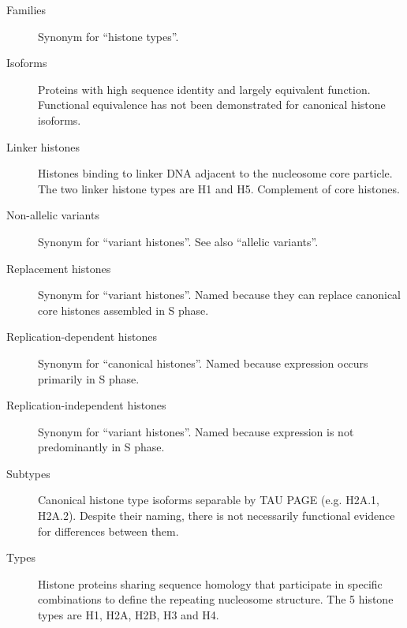 {\begin{shaded}
\begin{description}
        \item[Families] \hfill \newline
        Synonym for ``histone types''.

        \item[Isoforms] \hfill \newline
        Proteins with high sequence identity and largely equivalent function.
        Functional equivalence has not been demonstrated for canonical histone isoforms.

        \item[Linker histones] \hfill \newline
        Histones binding to linker DNA adjacent to the nucleosome core particle.
        The two linker histone types are H1 and H5. Complement of core histones.

        \item[Non-allelic variants] \hfill \newline
        Synonym for ``variant histones''. See also ``allelic variants''.

        \item[Replacement histones] \hfill \newline
        Synonym for ``variant histones''.
        Named because they can replace canonical core histones assembled in S phase.

        \item[Replication-dependent histones] \hfill \newline
        Synonym for ``canonical histones''.
        Named because expression occurs primarily in S phase.

        \item[Replication-independent histones] \hfill \newline
        Synonym for ``variant histones''.
        Named because expression is not predominantly in S phase.

        \item[Subtypes] \hfill \newline
        Canonical histone type isoforms separable by TAU PAGE
        (e.g. H2A.1, H2A.2).  Despite their naming, there is not necessarily functional evidence
		for differences between them.

        \item[Types] \hfill \newline
        Histone proteins sharing sequence homology
        that participate in specific combinations to define the repeating nucleosome structure.
        The 5 histone types are H1, H2A, H2B, H3 and H4.


\end{description}
\end{shaded}}

